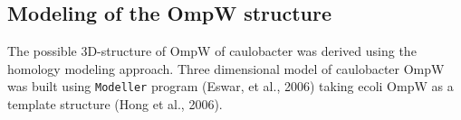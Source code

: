 \subsection{Modeling of the OmpW structure}
\label{sub:porin_modeling}
The possible 3D-structure of OmpW of \ac{caulobacter} was derived using the homology modeling approach. Three dimensional model of \ac{caulobacter} OmpW was built using \texttt{Modeller} program (Eswar, et al., 2006) taking \ac{ecoli} OmpW as a template structure (Hong et al., 2006).
 
